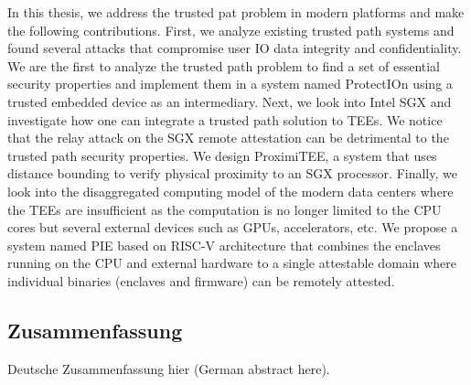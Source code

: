 In this thesis, we address the trusted pat problem in modern platforms and make the following contributions. First, we analyze existing trusted path systems and found several attacks that compromise user IO data integrity and confidentiality. We are the first to analyze the trusted path problem to find a set of essential security properties and implement them in a system named ProtectIOn using a trusted embedded device as an intermediary. Next, we look into Intel SGX and investigate how one can integrate a trusted path solution to TEEs. We notice that the relay attack on the SGX remote attestation can be detrimental to the trusted path security properties. We design ProximiTEE, a system that uses distance bounding to verify physical proximity to an SGX processor. Finally, we look into the disaggregated computing model of the modern data centers where the TEEs are insufficient as the computation is no longer limited to the CPU cores but several external devices such as GPUs, accelerators, etc. We propose a system named PIE based on RISC-V architecture that combines the enclaves running on the CPU and external hardware to a single attestable domain where individual binaries (enclaves and firmware) can be remotely attested.     
 

  


\endgroup

\cleardoublepage%

\begingroup
\let\clearpage\relax
\let\cleardoublepage\relax
\let\cleardoublepage\relax

\begin{otherlanguage}{ngerman}
\chapter*{Zusammenfassung}

Deutsche Zusammenfassung hier (German abstract here).

\end{otherlanguage}

\endgroup

\vfill